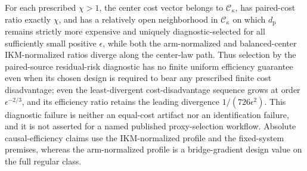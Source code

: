 For each prescribed \(\chi>1\), the center cost vector belongs to \(\mathcal C_\kappa\), has paired-cost ratio exactly \(\chi\), and has a relatively open neighborhood in \(\mathcal C_\kappa\) on which \(d_{\mathrm p}\) remains strictly more expensive and uniquely diagnostic-selected for all sufficiently small positive \(\epsilon\), while both the arm-normalized and balanced-center IKM-normalized ratios diverge along the center-law path. Thus selection by the paired-source residual-risk diagnostic has no finite uniform efficiency guarantee even when its chosen design is required to bear any prescribed finite cost disadvantage; even the least-divergent cost-disadvantage sequence grows at order \(\epsilon^{-2/3}\), and its efficiency ratio retains the leading divergence \(1/(726\epsilon^2)\). This diagnostic failure is neither an equal-cost artifact nor an identification failure, and it is not asserted for a named published proxy-selection workflow. Absolute causal-efficiency claims use the IKM-normalized profile and the fixed-system premises, whereas the arm-normalized profile is a bridge-gradient design value on the full regular class.